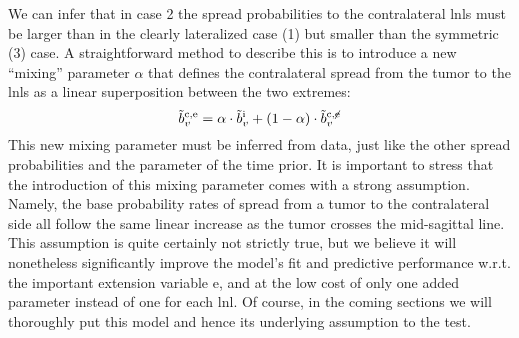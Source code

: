\documentclass[\relativeRoot/main.tex]{subfiles}
\begin{document}
We can infer that in case 2 the spread probabilities to the contralateral \glspl{lnl} must be larger than in the clearly lateralized case (1) but smaller than the symmetric (3) case. A straightforward method to describe this is to introduce a new ``mixing'' parameter $\alpha$ that defines the contralateral spread from the tumor to the \glspl{lnl} as a linear superposition between the two extremes:
%
\begin{equation}
    \Tilde{b}_v^{\text{c} , \text{e}} = \alpha \cdot \Tilde{b}_v^\text{i} + (1 - \alpha) \cdot \Tilde{b}_v^{\text{c} , \centernot{\text{e}}}
\end{equation}
%
This new mixing parameter must be inferred from data, just like the other spread probabilities and the parameter of the time prior. It is important to stress that the introduction of this mixing parameter comes with a strong assumption. Namely, the base probability rates of spread from a tumor to the contralateral side all follow the same linear increase as the tumor crosses the mid-sagittal line. This assumption is quite certainly not strictly true, but we believe it will nonetheless significantly improve the model's fit and predictive performance w.r.t. the important extension variable $\text{e}$, and at the low cost of only one added parameter instead of one for each \gls{lnl}. Of course, in the coming sections we will thoroughly put this model and hence its underlying assumption to the test.
\end{document}
